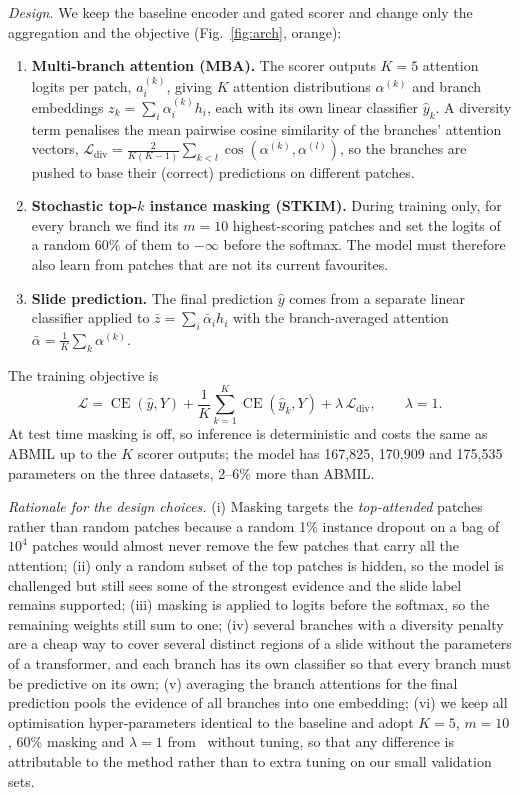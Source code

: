\documentclass[conference]{IEEEtran}
\DeclareMathOperator{\CE}{CE}
\begin{document}
\emph{Design.} We keep the baseline encoder and gated scorer and change only the aggregation and the objective (Fig.~\ref{fig:arch}, orange):
\begin{enumerate}
\item \textbf{Multi-branch attention (MBA).} The scorer outputs $K{=}5$ attention logits per patch, $a^{(k)}_i$, giving $K$ attention distributions $\alpha^{(k)}$ and branch embeddings $z_k=\sum_i\alpha^{(k)}_i h_i$, each with its own linear classifier $\hat y_k$. A diversity term penalises the mean pairwise cosine similarity of the branches' attention vectors, $\mathcal{L}_{\text{div}}=\frac{2}{K(K-1)}\sum_{k<l}\cos(\alpha^{(k)},\alpha^{(l)})$, so the branches are pushed to base their (correct) predictions on different patches.
\item \textbf{Stochastic top-$k$ instance masking (STKIM).} During training only, for every branch we find its $m{=}10$ highest-scoring patches and set the logits of a random 60\% of them to $-\infty$ before the softmax. The model must therefore also learn from patches that are not its current favourites.
\item \textbf{Slide prediction.} The final prediction $\hat y$ comes from a separate linear classifier applied to $\bar z=\sum_i\bar\alpha_i h_i$ with the branch-averaged attention $\bar\alpha=\frac1K\sum_k\alpha^{(k)}$.
\end{enumerate}
The training objective is
\begin{equation}
\mathcal{L}=\CE(\hat y,Y)+\frac1K\sum_{k=1}^{K}\CE(\hat y_k,Y)+\lambda\,\mathcal{L}_{\text{div}},\qquad \lambda=1.
\end{equation}
At test time masking is off, so inference is deterministic and costs the same as ABMIL up to the $K$ scorer outputs; the model has 167{,}825, 170{,}909 and 175{,}535 parameters on the three datasets, 2--6\% more than ABMIL.

\emph{Rationale for the design choices.} (i) Masking targets the \emph{top-attended} patches rather than random patches because a random 1\% instance dropout on a bag of $10^4$ patches would almost never remove the few patches that carry all the attention; (ii) only a random subset of the top patches is hidden, so the model is challenged but still sees some of the strongest evidence and the slide label remains supported; (iii) masking is applied to logits before the softmax, so the remaining weights still sum to one; (iv) several branches with a diversity penalty are a cheap way to cover several distinct regions of a slide without the parameters of a transformer, and each branch has its own classifier so that every branch must be predictive on its own; (v) averaging the branch attentions for the final prediction pools the evidence of all branches into one embedding; (vi) we keep all optimisation hyper-parameters identical to the baseline and adopt $K{=}5$, $m{=}10$, 60\% masking and $\lambda{=}1$ from~\cite{zhang2024acmil} without tuning, so that any difference is attributable to the method rather than to extra tuning on our small validation sets.
\end{document}
